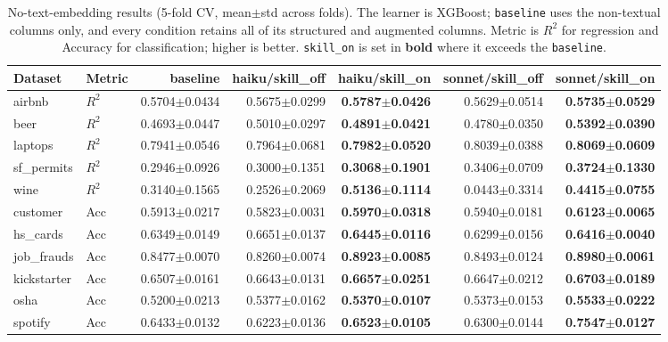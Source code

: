 \begin{table}[t]
\centering
\caption{No-text-embedding results (5-fold CV, mean$\pm$std across folds). The learner is XGBoost; \texttt{baseline} uses the non-textual columns only, and every condition retains all of its structured and augmented columns. Metric is $R^2$ for regression and Accuracy for classification; higher is better. \texttt{skill\_on} is set in \textbf{bold} where it exceeds the \texttt{baseline}.}
\label{tab:no_text}
\footnotesize
\setlength{\tabcolsep}{3pt}
\begin{tabular}{llrrrrr}
\toprule
Dataset & Metric & baseline & haiku/skill\_off & haiku/skill\_on & sonnet/skill\_off & sonnet/skill\_on \\
\midrule
airbnb      & $R^2$ & 0.5704$\pm$0.0434 & 0.5675$\pm$0.0299 & \textbf{0.5787$\pm$0.0426} & 0.5629$\pm$0.0514 & \textbf{0.5735$\pm$0.0529} \\
beer        & $R^2$ & 0.4693$\pm$0.0447 & 0.5010$\pm$0.0297 & \textbf{0.4891$\pm$0.0421} & 0.4780$\pm$0.0350 & \textbf{0.5392$\pm$0.0390} \\
laptops     & $R^2$ & 0.7941$\pm$0.0546 & 0.7964$\pm$0.0681 & \textbf{0.7982$\pm$0.0520} & 0.8039$\pm$0.0388 & \textbf{0.8069$\pm$0.0609} \\
sf\_permits  & $R^2$ & 0.2946$\pm$0.0926 & 0.3000$\pm$0.1351 & \textbf{0.3068$\pm$0.1901} & 0.3406$\pm$0.0709 & \textbf{0.3724$\pm$0.1330} \\
wine        & $R^2$ & 0.3140$\pm$0.1565 & 0.2526$\pm$0.2069 & \textbf{0.5136$\pm$0.1114} & 0.0443$\pm$0.3314 & \textbf{0.4415$\pm$0.0755} \\
\midrule
customer    & Acc & 0.5913$\pm$0.0217 & 0.5823$\pm$0.0031 & \textbf{0.5970$\pm$0.0318} & 0.5940$\pm$0.0181 & \textbf{0.6123$\pm$0.0065} \\
hs\_cards    & Acc & 0.6349$\pm$0.0149 & 0.6651$\pm$0.0137 & \textbf{0.6445$\pm$0.0116} & 0.6299$\pm$0.0156 & \textbf{0.6416$\pm$0.0040} \\
job\_frauds  & Acc & 0.8477$\pm$0.0070 & 0.8260$\pm$0.0074 & \textbf{0.8923$\pm$0.0085} & 0.8493$\pm$0.0124 & \textbf{0.8980$\pm$0.0061} \\
kickstarter & Acc & 0.6507$\pm$0.0161 & 0.6643$\pm$0.0131 & \textbf{0.6657$\pm$0.0251} & 0.6647$\pm$0.0212 & \textbf{0.6703$\pm$0.0189} \\
osha        & Acc & 0.5200$\pm$0.0213 & 0.5377$\pm$0.0162 & \textbf{0.5370$\pm$0.0107} & 0.5373$\pm$0.0153 & \textbf{0.5533$\pm$0.0222} \\
spotify     & Acc & 0.6433$\pm$0.0132 & 0.6223$\pm$0.0136 & \textbf{0.6523$\pm$0.0105} & 0.6300$\pm$0.0144 & \textbf{0.7547$\pm$0.0127} \\
\bottomrule
\end{tabular}


\end{table}
